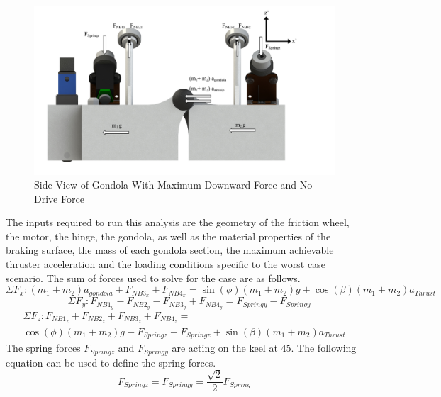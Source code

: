 \documentclass[../main.tex]{subfiles}
\begin{document}
\begin{figure}[H]
	\centering
	\includegraphics[width=1.1\textwidth]{img/gondola/sideGondolaNoDrive.pdf}
	\caption{Side View of Gondola With Maximum Downward Force and No Drive Force}
	\label{fig:sideGondolaNoDrive}
\end{figure}

The inputs required to run this analysis are the geometry of the friction wheel, the motor, the hinge, the gondola, as well as the material properties of the braking surface, the mass of each gondola section, the maximum achievable thruster acceleration and the loading conditions specific to the worst case scenario. The sum of forces used to solve for the case are as follows. 
\begin{equation} \label{FxGondLA}
\Sigma F_{x} : (m_{1}+m_{2}) a_{gondola} + F_{NB3_{x}} + F_{NB4_{x}} = \sin(\phi) (m_{1} + m_2)g + \cos(\beta) (m_1+m_2) a_{Thrust} 
\end{equation}
\begin{equation} \label{FyGondLA}
\hspace{12pt}\Sigma F_{y} : F_{NB1_{y}} - F_{NB2_{y}} - F_{NB3_{y}} + F_{NB4_{y}} =  F_{Springy} -F_{Springy} 
\end{equation}
\begin{multline} \label{FzGondLA}
\Sigma F_{z} : F_{NB1_{z}} + F_{NB2_{z}} + F_{NB3_{z}} + F_{NB4_{z}} =\\ \cos(\phi) (m_{1} + m_2)g -  F_{Springz} - F_{Springz} + \sin(\beta) (m_1+m_2) a_{Thrust}
\end{multline}
The spring forces $F_{Springz}$ and $F_{Springy}$ are acting on the keel at 45\textdegree. The following equation can be used to define the spring forces. 
\begin{equation}
F_{Springz} = F_{Springy} = \frac{\sqrt{2}}{2} F_{Spring}
\end{equation} \\
\end{document}
